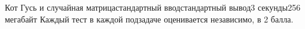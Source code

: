 \begin{problem}{Кот Гусь и случайная матрица}{стандартный ввод}{стандартный вывод}{3 секунды}{256 мегабайт}
Каждый тест в каждой подзадаче оценивается независимо, в 2 балла.

\Example

\begin{example}
%
\end{example}

\end{problem}

